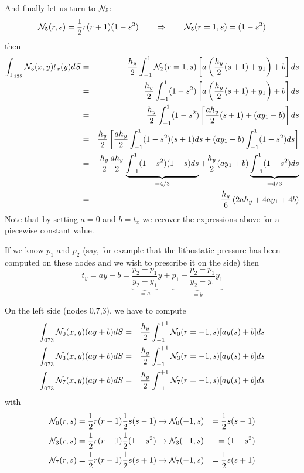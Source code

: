 And finally let us turn to ${\mathcal{N}}_5$:
\[
{\mathcal{N}}_5(r,s) = \frac12 r(r+1) (1-s^2)
\qquad
\Rightarrow
\qquad
{\mathcal{N}}_5(r=1,s) =  (1-s^2)
\]
then
\begin{eqnarray}
\int_{\Gamma_{125}} {\mathcal{N}}_5(x,y) t_x(y) dS 
&=&\frac{h_y}{2} \int_{-1}^1 {\mathcal{N}}_2(r=1,s) \left[ a \left(\frac{h_y}{2}(s+1) +y_1\right) +b \right] ds \nonumber\\
&=&\frac{h_y}{2} \int_{-1}^1  (1-s^2) \left[ a \left(\frac{h_y}{2}(s+1) +y_1\right) +b \right] ds \nonumber\\
&=&\frac{h_y}{2} \int_{-1}^1 (1-s^2) \left[ \frac{a h_y}{2}(s+1) + (ay_1+b) \right] ds \nonumber\\
&=& \frac{h_y}{2} \left[
\frac{a h_y}{2} \int_{-1}^1 (1-s^2) (s+1)  ds 
+(ay_1+b) \int_{-1}^1 (1-s^2)   ds 
\right] \nonumber\\
&=& \frac{h_y}{2} \frac{a h_y}{2} \underbrace{\int_{-1}^1 (1-s^2)(1+s)  ds}_{=4/3} 
+\frac{h_y}{2} (ay_1+b) \underbrace{\int_{-1}^1 (1-s^2)  ds}_{=4/3} \nonumber \\
&=& \frac{h_y}{6} \left( 2 a h_y + 4ay_1+4 b   \right)
\end{eqnarray}
Note that by setting $a=0$ and $b=t_x$ we recover the expressions above for a 
piecewise constant value.

If we know $p_1$ and $p_2$ (say, for example that the lithostatic pressure has been computed on these nodes
and we wish to prescribe it on the side) then 
\[
t_y=ay+b = \underbrace{\frac{p_2-p_1}{y_2-y_1}}_{=a} y + \underbrace{p_1-\frac{p_2-p_1}{y_2-y_1} y_1}_{=b}
\]

On the left side (nodes 0,7,3), we have to compute
\begin{eqnarray}
\int_{073} {\mathcal{N}}_0(x,y) (ay+b) dS
&=& \frac{h_y}{2} \int_{-1}^{+1} {\mathcal{N}}_0(r=-1,s) [ay(s)+b] ds \\
\int_{073} {\mathcal{N}}_3(x,y) (ay+b) dS 
&=& \frac{h_y}{2} \int_{-1}^{+1} {\mathcal{N}}_3(r=-1,s) [ay(s)+b] ds  \\
\int_{073} {\mathcal{N}}_7(x,y) (ay+b) dS 
&=& \frac{h_y}{2} \int_{-1}^{+1} {\mathcal{N}}_7(r=-1,s) [ay(s)+b] ds  
\end{eqnarray}
with 
\begin{align}
{\mathcal{N}}_0 (r,s) &= \frac12 r(r-1) \frac12 s(s-1)  \rightarrow  {\mathcal{N}}_0 (-1,s) &=  \frac12 s(s-1) \nonumber\\  
{\mathcal{N}}_3 (r,s) &= \frac12 r(r-1) \frac12 (1-s^2) \rightarrow  {\mathcal{N}}_3 (-1,s) &=  (1-s^2) \nonumber\\
{\mathcal{N}}_7 (r,s) &= \frac12 r(r-1) \frac12 s(s+1)  \rightarrow  {\mathcal{N}}_7 (-1,s) &=  \frac12 s(s+1) \nonumber
\end{align}


